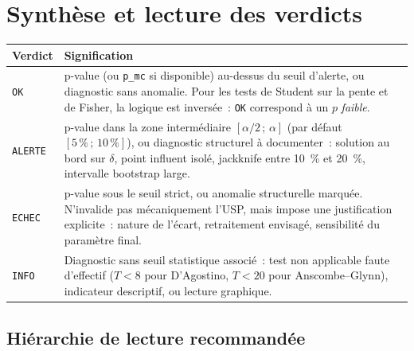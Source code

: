 \documentclass[a4paper,11pt]{article}
\newcommand{\code}[1]{\texttt{\small #1}}
\begin{document}
\newpage
\clearpage
\section{Synthèse et lecture des verdicts}

\begin{center}
\small
\begin{tabular}{@{}p{2.1cm}p{13.2cm}@{}}
\toprule
\textbf{Verdict} & \textbf{Signification} \\
\midrule
\code{OK} & p-value (ou \code{p\_mc} si disponible) au-dessus du seuil d'alerte, ou diagnostic
sans anomalie. Pour les tests de Student sur la pente et de Fisher, la logique est inversée~:
\code{OK} correspond à un $p$ \emph{faible}. \\
\code{ALERTE} & p-value dans la zone intermédiaire $[\alpha/2\,;\,\alpha]$ (par défaut
$[5\,\%\,;\,10\,\%]$), ou diagnostic structurel à documenter~: solution au bord sur $\delta$,
point influent isolé, jackknife entre 10~\% et 20~\%, intervalle bootstrap large. \\
\code{ECHEC} & p-value sous le seuil strict, ou anomalie structurelle marquée. N'invalide pas
mécaniquement l'USP, mais impose une justification explicite~: nature de l'écart, retraitement
envisagé, sensibilité du paramètre final. \\
\code{INFO} & Diagnostic sans seuil statistique associé~: test non applicable faute d'effectif
($T < 8$ pour D'Agostino, $T < 20$ pour Anscombe--Glynn), indicateur descriptif, ou lecture
graphique. \\
\bottomrule
\end{tabular}
\end{center}

\subsection*{Hiérarchie de lecture recommandée}
\end{document}
